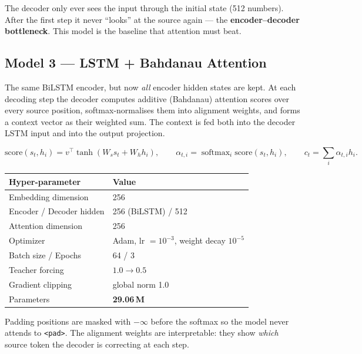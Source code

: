 \documentclass[11pt,a4paper]{article}
\begin{document}
The decoder only ever sees the input through the initial state (512 numbers).
After the first step it never ``looks'' at the source again --- the
\textbf{encoder--decoder bottleneck}. This model is the baseline that attention
must beat.

\subsection{Model 3 --- LSTM + Bahdanau Attention}
The same BiLSTM encoder, but now \emph{all} encoder hidden states are kept. At
each decoding step the decoder computes additive (Bahdanau) attention scores
over every source position, softmax-normalises them into alignment weights, and
forms a context vector as their weighted sum. The context is fed both into the
decoder LSTM input and into the output projection.

\begin{equation}
\text{score}(s_t,h_i)=v^{\top}\tanh(W_s s_t + W_h h_i),\qquad
\alpha_{t,i}=\operatorname{softmax}_i \text{score}(s_t,h_i),\qquad
c_t=\sum_i \alpha_{t,i} h_i .
\end{equation}

\begin{center}
\begin{tabular}{ll}
\toprule
Hyper-parameter & Value \\
\midrule
Embedding dimension      & 256 \\
Encoder / Decoder hidden & 256 (BiLSTM) / 512 \\
Attention dimension      & 256 \\
Optimizer                & Adam, lr $=10^{-3}$, weight decay $10^{-5}$ \\
Batch size / Epochs      & 64 / 3 \\
Teacher forcing          & $1.0 \rightarrow 0.5$ \\
Gradient clipping        & global norm 1.0 \\
Parameters               & \textbf{29.06\,M} \\
\bottomrule
\end{tabular}
\end{center}

Padding positions are masked with $-\infty$ before the softmax so the model
never attends to \texttt{<pad>}. The alignment weights are interpretable: they
show \emph{which} source token the decoder is correcting at each step.

\end{document}

